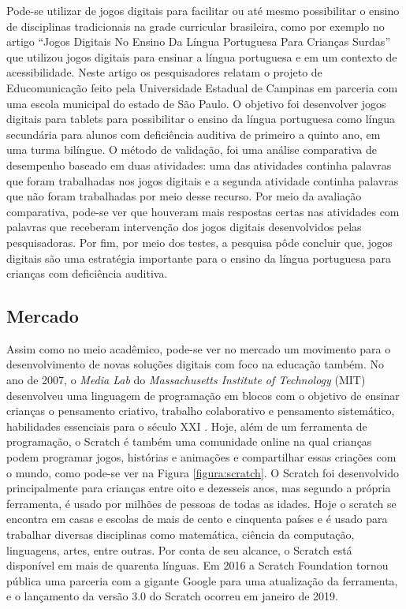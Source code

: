 Pode-se utilizar de jogos digitais para facilitar ou até mesmo possibilitar o ensino de disciplinas tradicionais na grade curricular brasileira, como por exemplo no artigo “Jogos Digitais No Ensino Da Língua Portuguesa Para Crianças Surdas” \cite{liz_2017} que utilizou jogos digitais para ensinar a língua portuguesa e em um contexto de acessibilidade. Neste artigo os pesquisadores relatam o projeto de Educomunicação feito pela Universidade Estadual de Campinas em parceria com uma escola municipal do estado de São Paulo. O objetivo foi desenvolver jogos digitais para tablets para possibilitar o ensino da língua portuguesa como língua secundária para alunos com deficiência auditiva de primeiro a quinto ano, em uma turma bilíngue. O método de validação, foi uma análise comparativa de desempenho baseado em duas atividades: uma das atividades continha palavras que foram trabalhadas nos jogos digitais e a segunda atividade continha palavras que não foram trabalhadas por meio desse recurso. Por meio da avaliação comparativa, pode-se ver que houveram mais respostas certas nas atividades com palavras que receberam intervenção dos jogos digitais desenvolvidos pelas pesquisadoras. Por fim, por meio dos testes, a  pesquisa pôde concluir que, jogos digitais são uma estratégia importante para o ensino da língua portuguesa para crianças com deficiência auditiva.

\subsection{Mercado}
Assim como no meio acadêmico, pode-se ver no mercado um movimento para o desenvolvimento de novas soluções digitais com foco na educação também. 
No ano de 2007, o \textit{Media Lab} do \textit{Massachusetts Institute of Technology} (MIT) desenvolveu uma linguagem de programação em blocos com o objetivo de ensinar crianças o pensamento criativo, trabalho colaborativo e pensamento sistemático, habilidades essenciais para o século XXI \cite{about_scratch}. Hoje, além de um ferramenta de programação, o Scratch é também uma comunidade online na qual crianças podem programar jogos, histórias e animações e compartilhar essas criações com o mundo, como pode-se ver na Figura \ref{figura:scratch}. O Scratch foi desenvolvido principalmente para crianças entre oito e dezesseis anos, mas segundo a própria ferramenta, é usado por milhões de pessoas de todas as idades. Hoje o scratch se encontra em casas e escolas de mais de cento e cinquenta países e é usado para trabalhar diversas disciplinas como matemática, ciência da computação, linguagens, artes, entre outras. Por conta de seu alcance, o Scratch está disponível em mais de quarenta línguas. Em 2016 a Scratch Foundation tornou pública uma parceria com a gigante Google para uma atualização da ferramenta, e o lançamento da versão 3.0 do Scratch ocorreu em janeiro de 2019.

